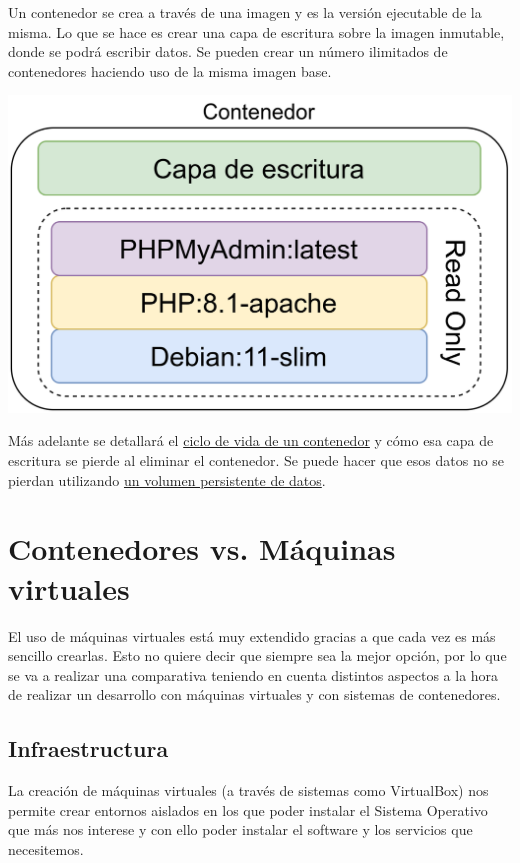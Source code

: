Un contenedor se crea a través de una imagen y es la versión ejecutable de la misma. Lo que se hace es crear una capa de escritura sobre la imagen inmutable, donde se podrá escribir datos. Se pueden crear un número ilimitados de contenedores haciendo uso de la misma imagen base.

\vspace{-15pt}
\begin{center}
    \includegraphics[width=0.6\linewidth]{img/docker/contenedor.png}
\end{center}
\vspace{-15pt}

Más adelante se detallará el \hyperlink{ciclo_de_vida_contenedor}{ciclo de vida de un contenedor} y cómo esa capa de escritura se pierde al eliminar el contenedor. Se puede hacer que esos datos no se pierdan utilizando \hyperlink{volumen_persistente_datos}{un volumen persistente de datos}.


\section{Contenedores vs. Máquinas virtuales}

El uso de máquinas virtuales está muy extendido gracias a que cada vez es más sencillo crearlas. Esto no quiere decir que siempre sea la mejor opción, por lo que  se va a realizar una comparativa teniendo en cuenta distintos aspectos a la hora de realizar un desarrollo con máquinas virtuales y con sistemas de contenedores.


\subsection{Infraestructura}

La creación de máquinas virtuales (a través de sistemas como VirtualBox) nos permite crear entornos aislados en los que poder instalar el Sistema Operativo que más nos interese y con ello poder instalar el software y los servicios que necesitemos.


